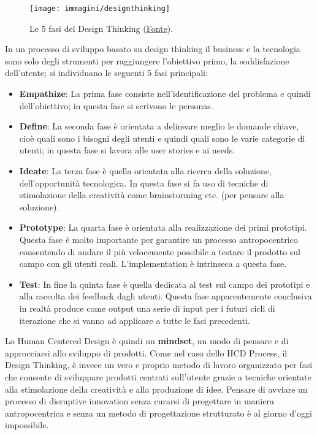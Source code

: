 \begin{figure}[!h]
	\centering
	\texttt{[image: immagini/designthinking]}
	\caption{Le 5 fasi del Design Thinking
	(\href{https://www.zerounoweb.it/cio-innovation/metodologie/design-thinking-definizione-esempi/}{\underline{Fonte}}).}
\end{figure}

In un processo di sviluppo basato su design thinking il business e la tecnologia sono solo degli strumenti per raggiungere l'obiettivo primo, la
soddisfazione dell'utente; si individuano le seguenti 5 fasi principali:

\begin{itemize}
	\itemsep-0.3em
	\item \textbf{Empathize}: La prima fase consiste nell’identificazione del problema e quindi dell’obiettivo; in questa fase si scrivono le personas.
	\item \textbf{Define}: La seconda fase è orientata a delineare meglio le domande chiave, cioè quali sono i bisogni degli utenti e quindi quali
	sono le varie categorie di utenti; in questa fase si lavora alle user stories e ai needs.
	\item \textbf{Ideate}: La terza fase è quella orientata alla ricerca della soluzione, dell'opportunità tecnologica. In questa fase si fa uso di
	tecniche di stimolazione della creatività come brainstorming etc. (per pensare alla soluzione).
	\item \textbf{Prototype}: La quarta fase è orientata alla realizzazione dei primi prototipi. Questa fase è molto importante per garantire un
	processo antropocentrico consentendo di andare il più velocemente possibile a testare il prodotto sul campo con gli utenti reali.
	L'implementation è intrinseca a questa fase.
	\item \textbf{Test}: In fine la quinta fase è quella dedicata al test sul campo dei prototipi e alla raccolta dei feedback dagli utenti.
	Questa fase apparentemente conclusiva in realtà produce come output una serie di input per i futuri cicli di iterazione che si vanno ad applicare
	a tutte le fasi precedenti.
\end{itemize}

Lo Human Centered Design è quindi un \textbf{mindset}, un modo di pensare e di approcciarsi allo sviluppo di prodotti. Come nel caso dello HCD
Process, il Design Thinking, è invece un vero e proprio metodo di lavoro organizzato per fasi che consente di sviluppare prodotti centrati sull'utente
grazie a tecniche orientate alla stimolazione della creatività e alla produzione di idee. Pensare di avviare un processo di disruptive innovation
senza curarsi di progettare in maniera antropocentrica e senza un metodo di progettazione strutturato è al giorno d'oggi impossibile.

